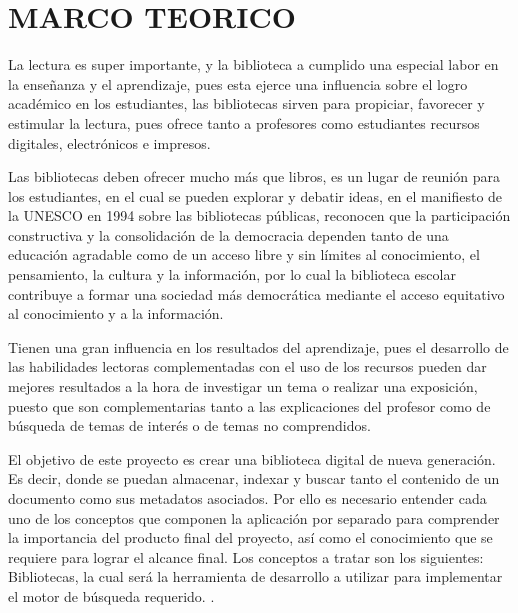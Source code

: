 \section{MARCO TEORICO} 

\begin{enumerate}[1.]
	
	La lectura es super importante, y la biblioteca a cumplido una especial labor en la enseñanza y el aprendizaje, pues esta ejerce una influencia sobre el logro académico en los estudiantes, las bibliotecas sirven para propiciar, favorecer y estimular la lectura, pues ofrece tanto a profesores como estudiantes recursos digitales, electrónicos e impresos. 
	
	Las bibliotecas deben ofrecer mucho más que libros, es un lugar de reunión para los estudiantes, en el cual se pueden explorar y debatir ideas, en el manifiesto de la UNESCO en 1994 sobre las bibliotecas públicas, reconocen que la participación constructiva y la consolidación de la democracia dependen tanto de una educación agradable como de un acceso libre y sin límites al conocimiento, el pensamiento, la cultura y la información, por lo cual la biblioteca escolar contribuye a formar una sociedad más democrática mediante el acceso equitativo al conocimiento y a la información.
	
	Tienen una gran influencia en los resultados del aprendizaje, pues el desarrollo de las habilidades lectoras complementadas con el uso de los recursos pueden dar mejores resultados a la hora de investigar un tema o realizar una exposición, puesto que son complementarias tanto a las explicaciones del profesor como de búsqueda de temas de interés o de temas no comprendidos. 
	
El objetivo de este proyecto es crear una biblioteca digital de nueva generación.
Es decir, donde se puedan almacenar, indexar y buscar tanto el contenido de un documento como sus metadatos asociados.
Por ello es necesario entender cada uno de los conceptos que componen la aplicación por separado para comprender la importancia 	del producto final del 	proyecto, así como el conocimiento que se requiere para lograr el alcance final.
Los conceptos a tratar son los siguientes: Bibliotecas, la cual será la	herramienta de desarrollo a utilizar para implementar el 	motor de búsqueda
requerido. .
    
\end{enumerate} 
